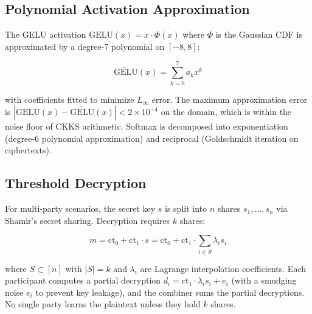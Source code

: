 \subsection{Polynomial Activation Approximation}

The GELU activation $\text{GELU}(x) = x \cdot \Phi(x)$ where $\Phi$ is the
Gaussian CDF is approximated by a degree-7 polynomial on $[-8, 8]$:

\begin{equation}
\widetilde{\text{GELU}}(x) = \sum_{k=0}^{7} a_k x^k
\end{equation}

with coefficients fitted to minimize $L_\infty$ error. The maximum
approximation error is $|\text{GELU}(x) - \widetilde{\text{GELU}}(x)| <
2 \times 10^{-4}$ on the domain, which is within the noise floor of CKKS
arithmetic. Softmax is decomposed into exponentiation (degree-6 polynomial
approximation) and reciprocal (Goldschmidt iteration on ciphertexts).

\subsection{Threshold Decryption}

For multi-party scenarios, the secret key $s$ is split into $n$ shares
$s_1, \ldots, s_n$ via Shamir's secret sharing. Decryption requires $k$
shares:

\begin{equation}
m = \text{ct}_0 + \text{ct}_1 \cdot s = \text{ct}_0 +
\text{ct}_1 \cdot \sum_{i \in S} \lambda_i s_i
\end{equation}

where $S \subset [n]$ with $|S| = k$ and $\lambda_i$ are Lagrange
interpolation coefficients. Each participant computes a partial decryption
$d_i = \text{ct}_1 \cdot \lambda_i s_i + e_i$ (with a smudging noise $e_i$
to prevent key leakage), and the combiner sums the partial decryptions. No
single party learns the plaintext unless they hold $k$ shares.

